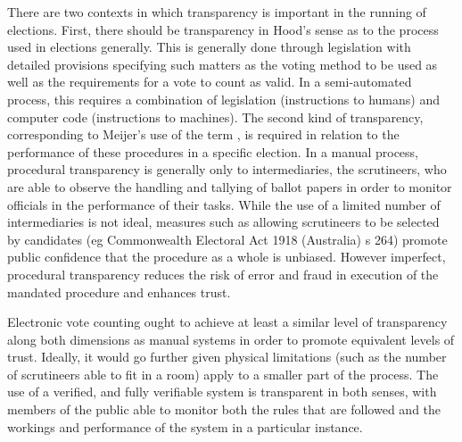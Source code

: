 There are two contexts in which transparency is important in the
running of elections. First, there should be transparency in Hood's
sense \cite{Hood:2001:T} as to the process used in elections generally. This is
generally done through legislation with detailed provisions
specifying such matters as the voting method to be used 
 as well as the requirements for a vote to count as valid.
In a semi-automated process, this requires a combination of
legislation (instructions to humans) and computer code (instructions
to machines). The second kind of transparency, corresponding to
Meijer’s use of the term \cite{Meijer:2014:T}, is required in relation to the
performance of these procedures in a specific election. In a manual
process, procedural transparency is generally only to
intermediaries, the scrutineers, who are able to observe the
handling and tallying of ballot papers in order to monitor officials
in the performance of their tasks. While the use of a limited number
of intermediaries is not ideal, measures such as allowing
scrutineers to be selected by candidates (eg Commonwealth Electoral
Act 1918 (Australia) s 264) promote public confidence that the
procedure as a whole is unbiased. However imperfect, procedural
transparency reduces the risk of error and fraud in execution of the
mandated procedure and enhances trust. 

Electronic vote counting ought to achieve at least a similar level
of transparency along both dimensions as manual systems in order to
promote equivalent levels of trust. Ideally, it would go further
given physical limitations (such as the number of scrutineers
able to fit in a room) apply to a smaller part of the process. The
use of a verified, and fully verifiable system is transparent in both senses, with members of
the public able to monitor both the rules that are followed
and the workings and performance of the system in a particular
instance. 

